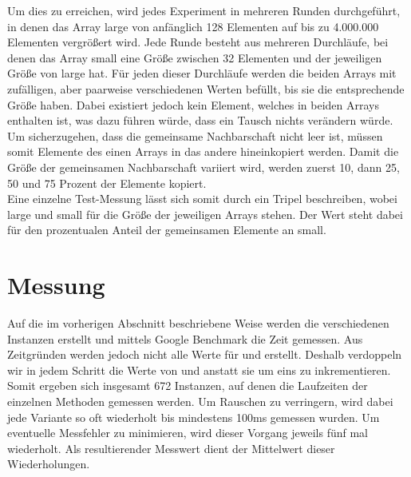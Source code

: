 Um dies zu erreichen, wird jedes Experiment in  mehreren Runden durchgeführt, in denen das Array large von anfänglich 128
Elementen auf bis zu 4.000.000 Elementen vergrößert wird. 
Jede Runde besteht aus mehreren Durchläufe, bei denen das Array small eine Größe zwischen 32 Elementen und der jeweiligen Größe von large hat.
Für jeden dieser Durchläufe werden die beiden Arrays mit zufälligen, aber paarweise verschiedenen
Werten befüllt, bis sie die entsprechende Größe haben. 
Dabei existiert jedoch kein Element, welches in beiden Arrays 
enthalten ist, was dazu führen würde, dass ein \gc{} 
Tausch nichts verändern würde. Um sicherzugehen,
dass die gemeinsame Nachbarschaft nicht leer ist, müssen somit Elemente des einen Arrays 
in das andere hineinkopiert werden. Damit die Größe der gemeinsamen Nachbarschaft
variiert wird, werden zuerst 10, dann 25, 50 und 75 Prozent der Elemente kopiert. 
\\

Eine einzelne Test-Messung lässt sich somit durch ein Tripel \fett{(\la, \sm, \fr)} beschreiben, wobei
large  und small für die Größe der jeweiligen Arrays stehen.
Der Wert \fett{\fr} steht dabei für den prozentualen Anteil der gemeinsamen Elemente an small.






\section{Messung}
\label{sec:messung}
Auf die im vorherigen Abschnitt beschriebene Weise werden die verschiedenen Instanzen erstellt und
mittels Google Benchmark die Zeit gemessen. Aus Zeitgründen werden jedoch nicht alle Werte 
für \la{} und \sm{} erstellt. Deshalb verdoppeln wir in jedem Schritt die Werte von \la{} und \sm{,}
anstatt sie um eins zu inkrementieren. Somit ergeben sich insgesamt 672 Instanzen, auf denen die Laufzeiten der 
einzelnen Methoden gemessen werden. 
Um Rauschen zu verringern, wird dabei jede Variante so oft wiederholt
 bis mindestens 100ms gemessen wurden.
Um eventuelle Messfehler zu minimieren, wird
dieser Vorgang 
jeweils fünf mal wiederholt. 
Als resultierender Messwert dient der Mittelwert dieser Wiederholungen.
\\

